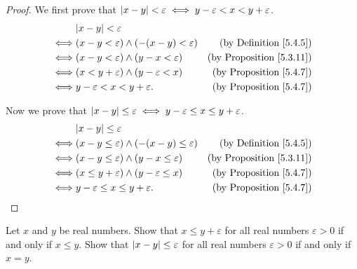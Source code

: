 \begin{proof}
    We first prove that \(\abs*{x - y} < \varepsilon \iff y - \varepsilon < x < y + \varepsilon\).
    \begin{align*}
             & \abs*{x - y} < \varepsilon                                                                  \\
        \iff & (x - y < \varepsilon) \land (-(x - y) < \varepsilon) & \text{(by Definition \ref{5.4.5})}   \\
        \iff & (x - y < \varepsilon) \land (y - x < \varepsilon)    & \text{(by Proposition \ref{5.3.11})} \\
        \iff & (x < y + \varepsilon) \land (y - \varepsilon < x)    & \text{(by Proposition \ref{5.4.7})}  \\
        \iff & y - \varepsilon < x < y + \varepsilon.               & \text{(by Proposition \ref{5.4.7})}
    \end{align*}

    Now we prove that \(\abs*{x - y} \leq \varepsilon \iff y - \varepsilon \leq x \leq y + \varepsilon\).
    \begin{align*}
             & \abs*{x - y} \leq \varepsilon                                                                     \\
        \iff & (x - y \leq \varepsilon) \land (-(x - y) \leq \varepsilon) & \text{(by Definition \ref{5.4.5})}   \\
        \iff & (x - y \leq \varepsilon) \land (y - x \leq \varepsilon)    & \text{(by Proposition \ref{5.3.11})} \\
        \iff & (x \leq y + \varepsilon) \land (y - \varepsilon \leq x)    & \text{(by Proposition \ref{5.4.7})}  \\
        \iff & y - \varepsilon \leq x \leq y + \varepsilon.               & \text{(by Proposition \ref{5.4.7})}
    \end{align*}
\end{proof}

\begin{exercise}\label{ex 5.4.7}
    Let \(x\) and \(y\) be real numbers.
    Show that \(x \leq y + \varepsilon\) for all real numbers \(\varepsilon > 0\) if and only if \(x \leq y\).
    Show that \(\abs*{x - y} \leq \varepsilon\) for all real numbers \(\varepsilon > 0\) if and only if \(x = y\).
\end{exercise}


